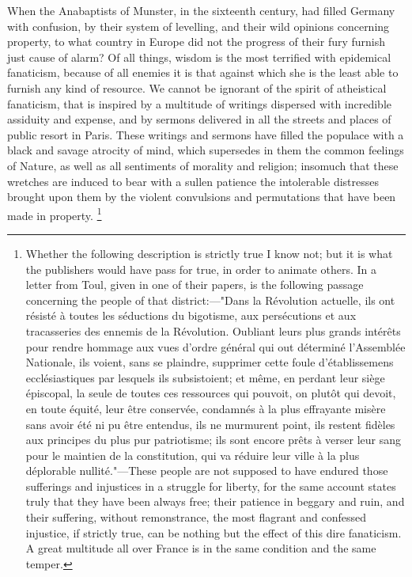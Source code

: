 When the Anabaptists of Munster, in the sixteenth century, had filled Germany with confusion, by their system of levelling, and their wild opinions concerning property, to what country in Europe did not the progress of their fury furnish just cause of alarm? Of all things, wisdom is the most terrified with epidemical fanaticism, because of all enemies it is that against which she is the least able to furnish any kind of resource. We cannot be ignorant of the spirit of atheistical fanaticism, that is inspired by a multitude of writings dispersed with incredible assiduity and expense, and by sermons delivered in all the streets and places of public resort in Paris. These writings and sermons have filled the populace with a black and savage atrocity of mind, which supersedes in them the common feelings of Nature, as well as all sentiments of morality and religion; insomuch that these wretches are induced to bear with a sullen patience the intolerable distresses brought upon them by the violent convulsions and permutations that have been made in property.
\footnote{ Whether the following description is strictly true I know not; but it is what the publishers would have pass for true, in order to animate others. In a letter from Toul, given in one of their papers, is the following passage concerning the people of that district:—"Dans la Révolution actuelle, ils ont résisté à toutes les séductions du bigotisme, aux persécutions et aux tracasseries des ennemis de la Révolution. Oubliant leurs plus grands intérêts pour rendre hommage aux vues d'ordre général qui out déterminé l'Assemblée Nationale, ils voient, sans se plaindre, supprimer cette foule d'établissemens ecclésiastiques par lesquels ils subsistoient; et même, en perdant leur siège épiscopal, la seule de toutes ces ressources qui pouvoit, on plutôt qui devoit, en toute équité, leur être conservée, condamnés à la plus effrayante misère sans avoir été ni pu être entendus, ils ne murmurent point, ils restent fidèles aux principes du plus pur patriotisme; ils sont encore prêts à verser leur sang pour le maintien de la constitution, qui va réduire leur ville à la plus déplorable nullité."—These people are not supposed to have endured those sufferings and injustices in a struggle for liberty, for the same account states truly that they have been always free; their patience in beggary and ruin, and their suffering, without remonstrance, the most flagrant and confessed injustice, if strictly true, can be nothing but the effect of this dire fanaticism. A great multitude all over France is in the same condition and the same temper.}
